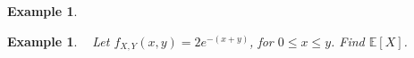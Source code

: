 \documentclass[12pt]{amsart}
\newtheorem{example}[theorem]{Example}
\newcommand\Ebb{\mathbb{E}}
\newcommand\pdfX{f_X(x)}
\newcommand\pdfXY{f_{X,Y}(x,y)}
\newcommand\intinft{\int_{-\infty}^{\infty}}
\begin{document}
{\begin{example}
\end{example}




\newpage

%
%



\begin{example}\label{28_E_joint}\ \newline
Let $\pdfXY = 2e^{-(x+y)}$, for $0 \leq x \leq y$. Find $\Ebb[X]$.

\end{example}


\newpage

}  %
\end{document}
